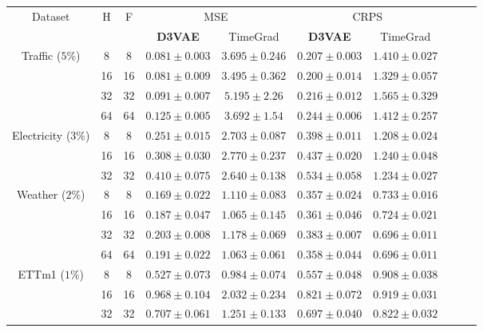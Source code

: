 \begin{table}[ht]
    \centering
    \begin{tabular}{cccccccccc}
        \toprule
        \multirow{2}{*}{Dataset} & \multirow{2}{*}{H} & \multirow{2}{*}{F} & \multicolumn{2}{c}{MSE} & \multicolumn{2}{c}{CRPS} \\
        \cmidrule(lr){4-5} \cmidrule(lr){6-7}
         & & & \textbf{D3VAE} & TimeGrad & \textbf{D3VAE} & TimeGrad \\
        \midrule
        \multirow{4}{*}{Traffic ($5\%$)} & 8  & 8  & $0.081 \pm 0.003$ & $3.695 \pm 0.246$ & $0.207 \pm 0.003$ & $1.410 \pm 0.027$ \\
         & 16 & 16 & $0.081 \pm 0.009$ & $3.495 \pm 0.362$ & $0.200 \pm 0.014$ & $1.329 \pm 0.057$ \\
         & 32 & 32 & $0.091 \pm 0.007$ & $5.195 \pm 2.26$  & $0.216 \pm 0.012$ & $1.565 \pm 0.329$ \\
         & 64 & 64 & $0.125 \pm 0.005$ & $3.692 \pm 1.54$  & $0.244 \pm 0.006$ & $1.412 \pm 0.257$ \\
        \midrule
        \multirow{3}{*}{Electricity ($3\%$)} & 8  & 8  & $0.251 \pm 0.015$ & $2.703 \pm 0.087$ & $0.398 \pm 0.011$ & $1.208 \pm 0.024$ \\
         & 16 & 16 & $0.308 \pm 0.030$ & $2.770 \pm 0.237$ & $0.437 \pm 0.020$ & $1.240 \pm 0.048$ \\
         & 32 & 32 & $0.410 \pm 0.075$ & $2.640 \pm 0.138$ & $0.534 \pm 0.058$ & $1.234 \pm 0.027$ \\
        \midrule
        \multirow{4}{*}{Weather ($2\%$)} & 8  & 8  & $0.169 \pm 0.022$ & $1.110 \pm 0.083$ & $0.357 \pm 0.024$ & $0.733 \pm 0.016$ \\
         & 16 & 16 & $0.187 \pm 0.047$ & $1.065 \pm 0.145$ & $0.361 \pm 0.046$ & $0.724 \pm 0.021$ \\
         & 32 & 32 & $0.203 \pm 0.008$ & $1.178 \pm 0.069$ & $0.383 \pm 0.007$ & $0.696 \pm 0.011$ \\
         & 64 & 64 & $0.191 \pm 0.022$ & $1.063 \pm 0.061$ & $0.358 \pm 0.044$ & $0.696 \pm 0.011$ \\
        \midrule
        \multirow{3}{*}{ETTm1 ($1\%$)} & 8  & 8  & $0.527 \pm 0.073$ & $0.984 \pm 0.074$ & $0.557 \pm 0.048$ & $0.908 \pm 0.038$ \\
         & 16 & 16 & $0.968 \pm 0.104$ & $2.032 \pm 0.234$ & $0.821 \pm 0.072$ & $0.919 \pm 0.031$ \\
         & 32 & 32 & $0.707 \pm 0.061$ & $1.251 \pm 0.133$ & $0.697 \pm 0.040$ & $0.822 \pm 0.032$ \\

\end{tabular}
\end{table}
